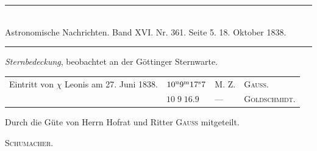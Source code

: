 \clearpage
\hypertarget{native-468-occultation}{}
\begin{center}
\rule{0.55\linewidth}{0.4pt}\\[2pt]
Astronomische Nachrichten. Band XVI. Nr. 361. Seite 5. 18. Oktober 1838.\\[2pt]
\rule{0.55\linewidth}{0.4pt}
\end{center}

\begin{center}\emph{Sternbedeckung}, beobachtet an der Göttinger Sternwarte.\end{center}

\begin{center}
\setlength{\tabcolsep}{2pt}
\begin{tabular}{llll}
Eintritt von $\chi$ Leonis am 27. Juni 1838. & $10^{\rm u}9^{\rm m}17^{\rm s}7$ & M. Z. & \textsc{Gauss.} \\
 & $10\;9\;16.9$ & --- & \textsc{Goldschmidt.} \\
\end{tabular}
\end{center}

Durch die Güte von Herrn Hofrat und Ritter \textsc{Gauss} mitgeteilt.
\begin{flushright}\textsc{Schumacher.}\end{flushright}
